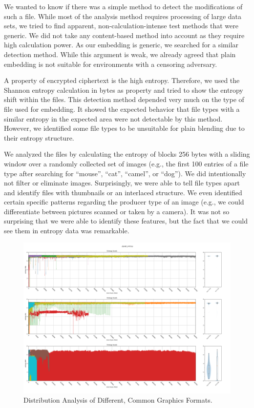 We wanted to know if there was a simple method to detect the modifications of such a file. While most of the analysis method requires processing of large data sets, we tried to find apparent, non-calculation-intense test methods that were generic. We did not take any content-based method into account as they require high calculation power. As our embedding is generic, we searched for a similar detection method. While this argument is weak, we already agreed that plain embedding is not suitable for environments with a censoring adversary.

A property of encrypted ciphertext is the high entropy. Therefore, we used the Shannon entropy calculation in bytes as property and tried to show the entropy shift within the files. This detection method depended very much on the type of file used for embedding. It showed the expected behavior that file types with a similar entropy in the expected area were not detectable by this method. However, we identified some file types to be unsuitable for plain blending due to their entropy structure.

We analyzed the files by calculating the entropy of blocks 256 bytes with a sliding window over a randomly collected set of images (e.g., the first 100 entries of a file type after searching for ``mouse'', ``cat'', ``camel'', or ``dog''). We did intentionally not filter or eliminate images. Surprisingly, we were able to tell file types apart and identify files with thumbnails or an interlaced structure. We even identified certain specific patterns regarding the producer type of an image (e.g., we could differentiate between pictures scanned or taken by a camera). It was not so surprising that we were able to identify these features, but the fact that we could see them in entropy data was remarkable.

\begin{figure}[ht]
	\includegraphics[width=\textwidth]{inc/statanalysis_graph}
	\caption{Distribution Analysis of Different, Common Graphics Formats.}
	\label{fig:statGraph}
\end{figure}

